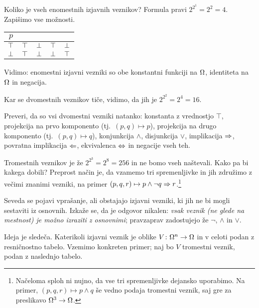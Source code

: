                 Koliko je vseh enomestnih izjavnih veznikov? Formula pravi $2^{2^1} = 2^2 = 4$. Zapišimo vse možnosti.

                \begin{center}
                        \begin{tabular}{c|cccc}
                                $p$ &&&& \\
                                \hline
                                $\top$ & $\top$ & $\bot$ & $\top$ & $\bot$ \\
                                $\bot$ & $\top$ & $\bot$ & $\bot$ & $\top$
                        \end{tabular}
                \end{center}

                Vidimo: enomestni izjavni vezniki so obe konstantni funkciji na $\Omega$, identiteta na $\Omega$ in negacija.

                Kar se dvomestnih veznikov tiče, vidimo, da jih je $2^{2^2} = 2^4 = 16$.

                \begin{naloga}
                        Preveri, da so vsi dvomestni vezniki natanko: konstanta z vrednostjo $\top$, projekcija na prvo komponento (tj.~$(p, q) \mapsto p$), projekcija na drugo komponento (tj.~$(p, q) \mapsto q$), konjunkcija $\land$, disjunkcija $\lor$, implikacija $\Rightarrow$, povratna implikacija $\Leftarrow$, ekvivalenca $\Leftrightarrow$ in negacije vseh teh.
                \end{naloga}

                Tromestnih veznikov je že $2^{2^3} = 2^8 = 256$ in ne bomo vseh naštevali. Kako pa bi kakega dobili? Preprost način je, da vzamemo tri spremenljivke in jih združimo z večimi znanimi vezniki, na primer $(p, q, r) \mapsto p \land \lnot{q} \Rightarrow r$.\footnote{Načeloma sploh ni nujno, da vse tri spremenljivke dejansko uporabimo. Na primer, $(p, q, r) \mapsto p \land q$ še vedno podaja tromestni veznik, saj gre za preslikavo $\Omega^3 \to \Omega$.}

                Seveda se pojavi vprašanje, ali obstajajo izjavni vezniki, ki jih ne bi mogli sestaviti iz osnovnih. Izkaže se, da je odgovor nikalen: \emph{vsak veznik (ne glede na mestnost) je možno izraziti z osnovnimi}; pravzaprav zadostujejo že $\lnot$, $\land$ in $\lor$.

                Ideja je sledeča. Katerikoli izjavni veznik je oblike $V\colon \Omega^n \to \Omega$ in v celoti podan z resničnostno tabelo. Vzemimo konkreten primer; naj bo $V$ tromestni veznik, podan z naslednjo tabelo.

